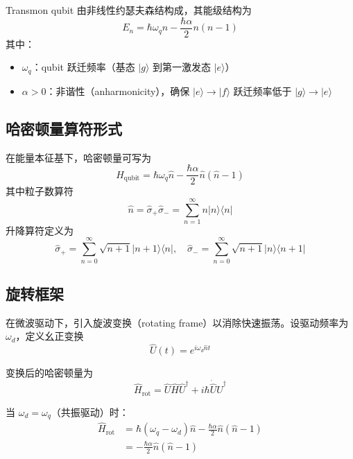 \documentclass[12pt,a4paper]{article}
\theoremstyle{definition}
\begin{document}
Transmon qubit 由非线性约瑟夫森结构成，其能级结构为
\begin{equation}
    E_n = \hbar\omega_q n - \frac{\hbar\alpha}{2}n(n-1)
    \label{eq:transmon_energy}
\end{equation}
其中：
\begin{itemize}
    \item $\omega_q$：qubit 跃迁频率（基态 $|g\rangle$ 到第一激发态 $|e\rangle$）
    \item $\alpha > 0$：非谐性（anharmonicity），确保 $|e\rangle \to |f\rangle$ 跃迁频率低于 $|g\rangle \to |e\rangle$
\end{itemize}

\subsection{哈密顿量算符形式}

在能量本征基下，哈密顿量可写为
\begin{equation}
    \hat{H}_{\text{qubit}} = \hbar\omega_q \hat{n} - \frac{\hbar\alpha}{2}\hat{n}(\hat{n}-1)
    \label{eq:transmon_hamiltonian}
\end{equation}
其中粒子数算符
\begin{equation}
    \hat{n} = \hat{\sigma}_+\hat{\sigma}_- = \sum_{n=1}^{\infty} n|n\rangle\langle n|
\end{equation}
升降算符定义为
\begin{equation}
    \hat{\sigma}_+ = \sum_{n=0}^{\infty} \sqrt{n+1}|n+1\rangle\langle n|, \quad
    \hat{\sigma}_- = \sum_{n=0}^{\infty} \sqrt{n+1}|n\rangle\langle n+1|
\end{equation}

\subsection{旋转框架}

在微波驱动下，引入旋波变换（rotating frame）以消除快速振荡。设驱动频率为 $\omega_d$，定义幺正变换
\begin{equation}
    \hat{U}(t) = e^{i\omega_d \hat{n} t}
\end{equation}

变换后的哈密顿量为
\begin{equation}
    \hat{H}_{\text{rot}} = \hat{U}\hat{H}\hat{U}^\dagger + i\hbar\dot{\hat{U}}\hat{U}^\dagger
\end{equation}

当 $\omega_d = \omega_q$（共振驱动）时：
\begin{align}
    \hat{H}_{\text{rot}} &= \hbar(\omega_q - \omega_d)\hat{n} - \frac{\hbar\alpha}{2}\hat{n}(\hat{n}-1) \nonumber\\
    &= -\frac{\hbar\alpha}{2}\hat{n}(\hat{n}-1)
    \label{eq:rotating_frame_hamiltonian}
\end{align}
\end{document}
